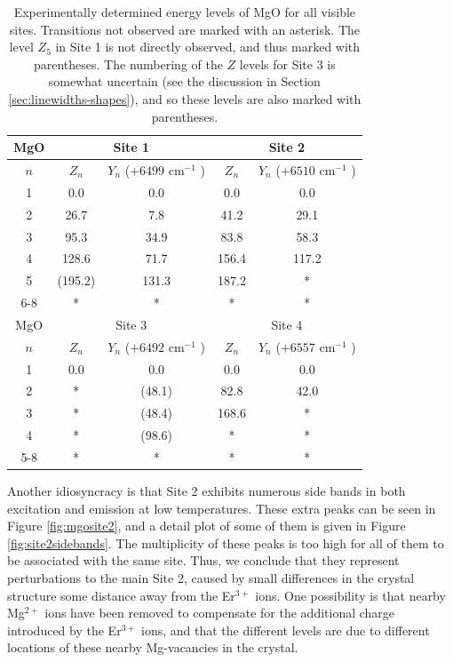 \documentclass[12pt]{report}
\newcommand{\erbium}[1][ ]{Er$^{3+}$#1}
\newcommand{\wn}[1][ ]{cm$^{-1}$#1}
\begin{document}
\begin{table}[t]
  \centering
  \begin{tabular}{| c | c | c | c | c |}
    \hline
    MgO & \multicolumn{2}{c|}{Site 1}& \multicolumn{2}{c|}{Site 2} \\
    \hline
    $n$ & $Z_{n}$ & $Y_{n}$ ($+6499$ \wn) & $Z_{n}$ & $Y_{n}$ ($+6510$ \wn) \\
    \hline 
    1 & 0.0 & 0.0 & 0.0 & 0.0 \\
    2 & 26.7 & 7.8 & 41.2 & 29.1 \\
    3 & 95.3 & 34.9 & 83.8 & 58.3 \\
    4 & 128.6 & 71.7 & 156.4 & 117.2 \\
    5 & (195.2) & 131.3 & 187.2 & * \\
    6-8 & * & * & * & * \\
    \hline \hline
    MgO & \multicolumn{2}{c|}{Site 3}& \multicolumn{2}{c|}{Site 4} \\
    \hline
    $n$ & $Z_{n}$ & $Y_{n}$ ($+6492$ \wn) & $Z_{n}$ & $Y_{n}$ ($+6557$ \wn)\\
    \hline 
    1 & 0.0 & 0.0 & 0.0 & 0.0  \\
    2 & * & (48.1) & 82.8 & 42.0 \\
    3 & * & (48.4) & 168.6 & *  \\
    4 & * & (98.6) & * & * \\
    5-8 & * & * & * & * \\
    \hline
  \end{tabular}
  \caption{Experimentally determined energy levels of MgO for all visible sites. Transitions not observed are marked with an asterisk. The level $Z_{5}$ in Site 1 is not directly observed, and thus marked with parentheses. The numbering of the $Z$ levels for Site 3 is somewhat uncertain (see the discussion in Section \ref{sec:linewidths-shapes}), and so these levels are also marked with parentheses.}
  \label{tab:mgolevels}
\end{table}

Another idiosyncracy is that Site 2 exhibits numerous side bands in both excitation and emission at low temperatures. These extra peaks can be seen in Figure \ref{fig:mgosite2}, and a detail plot of some of them is given in Figure \ref{fig:site2sidebands}. The multiplicity of these peaks is too high for all of them to be associated with the same site. Thus, we conclude that they represent perturbations to the main Site 2, caused by small differences in the crystal structure some distance away from the \erbium ions. One possibility is that nearby Mg$^{2+}$ ions have been removed to compensate for the additional charge introduced by the \erbium ions, and that the different levels are due to different locations of these nearby Mg-vacancies in the crystal.
\end{document}
